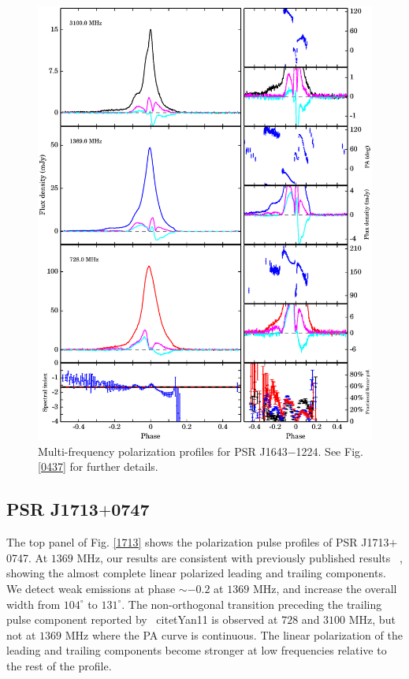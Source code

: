 \documentclass[useAMS,usenatbib]{mn2e}
\begin{document}
\begin{figure}
\begin{center}
\includegraphics[width=6 in]{1643.ps}
\caption{Multi-frequency polarization profiles for PSR J1643$-$1224. 
See Fig. \ref{0437} for further details.}
\label{1643}
\end{center}
\end{figure}


\subsection{PSR J1713$+$0747}

The top panel of Fig. \ref{1713} shows the polarization pulse profiles of 
PSR J1713$+$0747. 
%
At $1369$ MHz, our results are consistent with previously published results
~\citep{Ord04,Yan11}, showing the almost complete linear polarized leading and 
trailing components.
%
We detect weak emissions at phase $\sim-0.2$ at $1369$ MHz, and increase the 
overall width from $104^{\circ}$ to $131^{\circ}$. 
%
The non-orthogonal transition preceding the trailing pulse component reported 
by ~citet{Yan11} is observed at $728$ and $3100$ MHz, but not at $1369$ MHz 
where the PA curve is continuous.
%
The linear polarization of the leading and trailing components become stronger 
at low frequencies relative to the rest of the profile.
\end{document}
